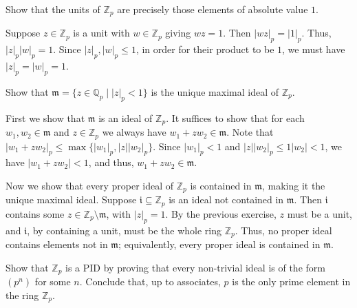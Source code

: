 \documentclass[12 pt, letterpaper]{hmcpset}
\begin{document}
\pagebreak

\begin{problem}[(6)]
	Show that the units of $\mathbb{Z}_{p}$ are precisely those elements of absolute value $1$.
\end{problem}

\begin{solution}
	Suppose $z \in \mathbb{Z}_{p}$ is a unit with $w \in \mathbb{Z}_{p}$ giving $wz = 1$. Then $\lvert w z \rvert_{p} = \lvert 1 \rvert_{p}$. Thus, $\lvert z \rvert_{p} \lvert w \rvert_{p} = 1$. Since $\lvert z \rvert_{p}, \lvert w \rvert_{p} \le 1$, in order for their product to be $1$, we must have $\lvert z \rvert_{p} = \lvert w \rvert_{p} = 1$.
\end{solution}

\pagebreak

\begin{problem}[(7)]
	Show that $\mathfrak{m} = \{ z \in \mathbb{Q}_{p} \mid \lvert z \rvert_{p} < 1 \}$ is the unique maximal ideal of $\mathbb{Z}_{p}$.
\end{problem}

\begin{solution}
	First we show that $\mathfrak{m}$ is an ideal of $\mathbb{Z}_{p}$. It suffices to show that for each $w_{1}, w_{2} \in \mathfrak{m}$ and $z \in \mathbb{Z}_{p}$ we always have $w_{1} + z w_{2} \in \mathfrak{m}$. Note that $\lvert w_{1} + z w_{2} \rvert_{p} \le \max \{ \lvert w_{1} \rvert_{p}, \lvert z \rvert \lvert w_{2} \rvert_{p} \}$. Since $\lvert w_{1} \rvert_{p} < 1$ and $\lvert z \rvert \lvert w_{2} \rvert_{p} \le 1 \lvert w_{2} \rvert < 1$, we have $\lvert w_{1} + z w_{2} \rvert < 1$, and thus, $w_{1} + z w_{2} \in \mathfrak{m}$.

	Now we show that every proper ideal of $\mathbb{Z}_{p}$ is contained in $\mathfrak{m}$, making it the unique maximal ideal. Suppose $\mathfrak{i} \subseteq \mathbb{Z}_{p}$ is an ideal not contained in $\mathfrak{m}$. Then $\mathfrak{i}$ contains some $z \in \mathbb{Z}_{p} \setminus \mathfrak{m}$, with $\lvert z \rvert_{p} = 1$. By the previous exercise, $z$ must be a unit, and $\mathfrak{i}$, by containing a unit, must be the whole ring $\mathbb{Z}_{p}$. Thus, no proper ideal contains elements not in $\mathfrak{m}$; equivalently, every proper ideal is contained in $\mathfrak{m}$.
\end{solution}

\pagebreak

\begin{problem}[(8)]
	Show that $\mathbb{Z}_{p}$ is a PID by proving that every non-trivial ideal is of the form $(p^{n})$ for some $n$. Conclude that, up to associates, $p$ is the only prime element in the ring $\mathbb{Z}_{p}$.
\end{problem}
\end{document}
